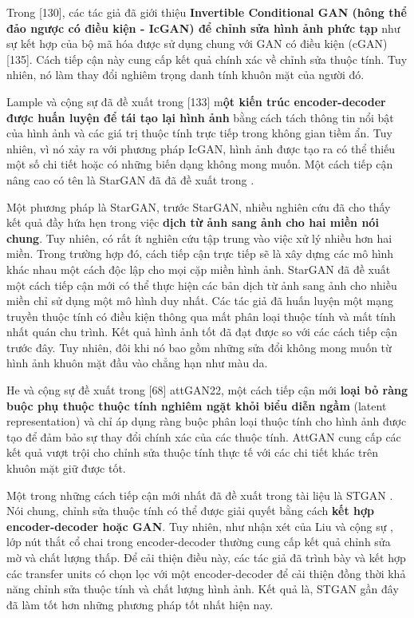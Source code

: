 \documentclass{article}
\begin{document}
Trong [130], các tác giả đã giới thiệu \textbf{Invertible Conditional GAN (hông thể đảo ngược có điều kiện - IcGAN) để chỉnh sửa hình ảnh phức tạp} như sự kết hợp của bộ mã hóa được sử dụng chung với GAN có điều kiện (cGAN) [135]. Cách tiếp cận này cung cấp kết quả chính xác về chỉnh sửa thuộc tính. Tuy nhiên, nó làm thay đổi nghiêm trọng danh tính khuôn mặt của người đó.

Lample và cộng sự đã đề xuất trong [133] m\textbf{ột kiến trúc encoder-decoder được huấn luyện để tái tạo lại hình ảnh} bằng cách tách thông tin nổi bật của hình ảnh và các giá trị thuộc tính trực tiếp trong không gian tiềm ẩn. Tuy nhiên, vì nó xảy ra với phương pháp IcGAN, hình ảnh được tạo ra có thể thiếu một số chi tiết hoặc có những biến dạng không mong muốn. Một cách tiếp cận nâng cao có tên là StarGAN đã đã đề xuất trong .

Một phương pháp là StarGAN, trước StarGAN, nhiều nghiên cứu đã cho thấy kết quả đầy hứa hẹn trong việc \textbf{dịch từ ảnh sang ảnh cho hai miền nói chung}. Tuy nhiên, có rất ít nghiên cứu tập trung vào việc xử lý nhiều hơn hai miền. Trong trường hợp đó, cách tiếp cận trực tiếp sẽ là xây dựng các mô hình khác nhau một cách độc lập cho mọi cặp miền hình ảnh. StarGAN đã đề xuất một cách tiếp cận mới có thể thực hiện các bản dịch từ ảnh sang ảnh cho nhiều miền chỉ sử dụng một mô hình duy nhất. Các tác giả đã huấn luyện một mạng truyền thuộc tính có điều kiện thông qua mất phân loại thuộc tính và mất tính nhất quán chu trình. Kết quả hình ảnh tốt đã đạt được so với các cách tiếp cận trước đây. Tuy nhiên, đôi khi nó bao gồm những sửa đổi không mong muốn từ hình ảnh khuôn mặt đầu vào chẳng hạn như màu da.

He và cộng sự đề xuất trong [68] attGAN22, một cách tiếp cận mới \textbf{loại bỏ ràng buộc phụ thuộc thuộc tính nghiêm ngặt khỏi biểu diễn ngầm} (latent representation) và chỉ áp dụng ràng buộc phân loại thuộc tính cho hình ảnh được tạo để đảm bảo sự thay đổi chính xác của các thuộc tính. AttGAN cung cấp các kết quả vượt trội cho chỉnh sửa thuộc tính thực tế với các chi tiết khác trên khuôn mặt giữ được tốt.

Một trong những cách tiếp cận mới nhất đã đề xuất trong tài liệu là STGAN . Nói chung, chỉnh sửa thuộc tính có thể được giải quyết bằng cách \textbf{kết hợp encoder-decoder hoặc GAN}. Tuy nhiên, như nhận xét của Liu và cộng sự , lớp nút thắt cổ chai trong encoder-decoder thường cung cấp kết quả chỉnh sửa mờ và chất lượng thấp. Để cải thiện điều này, các tác giả đã trình bày và kết hợp các transfer units có chọn lọc với một encoder-decoder để cải thiện đồng thời khả năng chỉnh sửa thuộc tính và chất lượng hình ảnh. Kết quả là, STGAN gần đây đã làm tốt hơn những phương pháp tốt nhất hiện nay.
\end{document}

